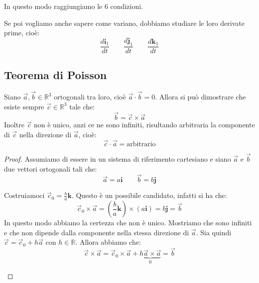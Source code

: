 \documentclass[11pt,a4paper,twoside]{article}
\theoremstyle{definition}
\begin{document}
In questo modo raggiungiamo le $6$ condizioni.

Se poi vogliamo anche sapere come variano, dobbiamo studiare le loro derivate prime, cioè:
\[ \frac{d\mathbf i_1}{dt}\qquad \frac{d \mathbf j_1}{dt} \qquad \frac{d \mathbf k_1}{dt} \]

\subsection{Teorema di Poisson}

\begin{prop}{}{}
	Siano $\vec a, \vec b \in \mathbb R^3$ ortogonali tra loro, cioè $\vec a \cdot \vec b = 0$. Allora si può dimostrare che esiste sempre $\vec c \in \mathbb R^3$ tale che:
	\[ \vec b = \vec c \times \vec a \]
	Inoltre $\vec c$ non è unico, anzi ce ne sono infiniti, risultando arbitraria la componente di $\vec c$ nella direzione di $\vec a$, cioè:
	\[\vec c \cdot \vec a = \text{arbitrario}\]
\end{prop}

\begin{proof}
	Assumiamo di essere in un sistema di riferimento cartesiano e siano $\vec a$ e $\vec b$ due vettori ortogonali tali che: \[\vec a = a \mathbf i \qquad \vec b = b \mathbf j\]
	\begin{center}
	\end{center}
	Costruiamoci $\vec c_0 = \frac ba \mathbf k$. Questo è un possibile candidato, infatti si ha che:
	\[ \vec c_0 \times \vec a = \left( \frac ba \mathbf k\right)\times (a \mathbf i) = b \mathbf j = \vec b \]
	In questo modo abbiamo la certezza che non è unico. Mostriamo che sono infiniti e che non dipende dalla componente nella stessa direzione di $\vec a$. Sia quindi $\vec c = \vec c_0 + h\vec a$ con $h \in \mathbb R$. Allora abbiamo che:
	\[ \vec c \times \vec a = \vec c_0 \times \vec a + \underbrace{h \vec a \times \vec a}_{0} = \vec b\]
	\begin{center}
	\end{center}
\end{proof}
\end{document}
